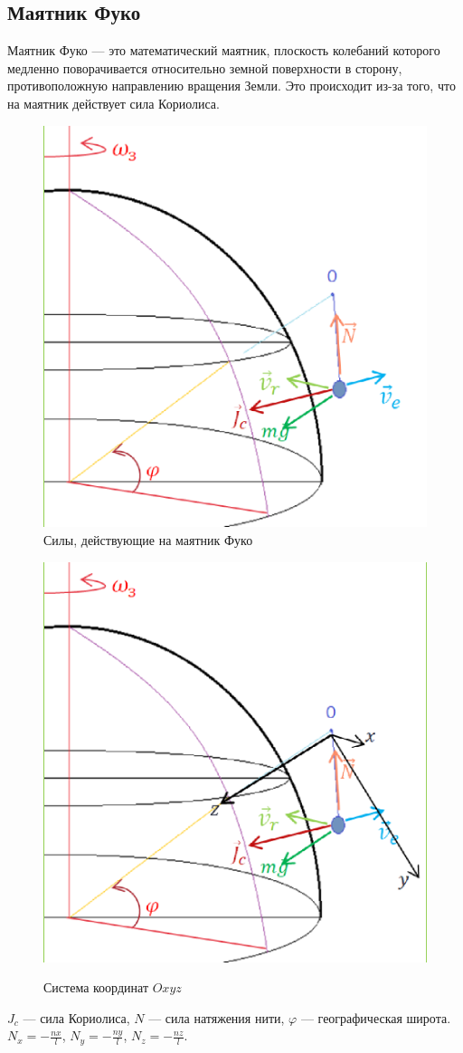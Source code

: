 \subsection*{Маятник Фуко}
Маятник Фуко --- это математический маятник, плоскость колебаний которого медленно поворачивается относительно земной поверхности в сторону, противоположную направлению вращения Земли. Это происходит из-за того, что на маятник действует сила Кориолиса.
\begin{figure}[h!]
	\begin{minipage}[h]{0.49\linewidth}
		\centering
		\includegraphics[width=0.5\linewidth]{fou1}\\
		\caption{Силы, действующие на маятник Фуко \label{fig:fou1}}
	\end{minipage}
	\begin{minipage}[h]{0.49\linewidth}
		\centering
		\includegraphics[width=0.5\linewidth]{fou2}\\
		\caption{Система координат $Oxyz$ \label{fig:fou2}}
	\end{minipage}
\end{figure} 
\clearpage
$J_c$ --- сила Кориолиса, $N$ --- сила натяжения нити, $\varphi$ --- географическая широта. $N_x = -\frac{nx}{l}$, $N_y = -\frac{ny}{l}$, $N_z = -\frac{nz}{l}$. 
